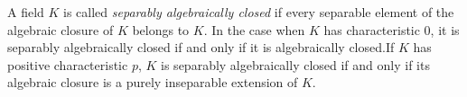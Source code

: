 \documentclass[12pt]{article}
\begin{document}
A field $K$ is called \emph{separably algebraically closed} if every separable element of the algebraic closure of $K$ belongs to $K$.\newline
 In the case when $K$ has characteristic 0, it is separably algebraically closed if and only if it is algebraically closed.\newline If $K$ has positive characteristic $p$, $K$ is separably algebraically closed if and only if its algebraic closure is a purely inseparable extension of $K$.


\end{document}
